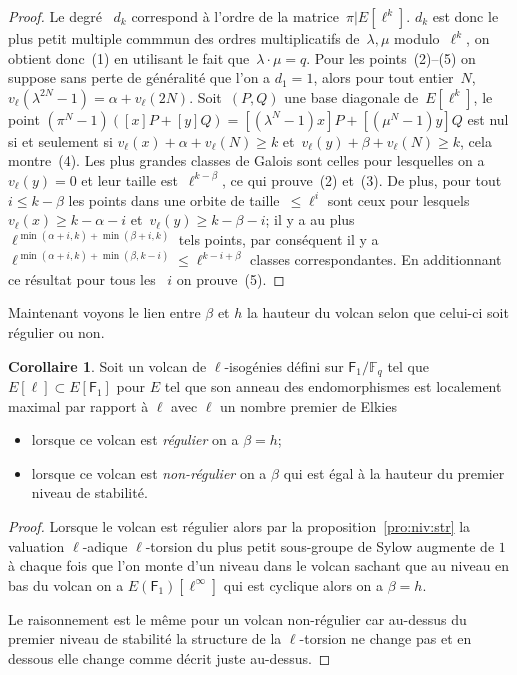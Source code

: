 \documentclass[10pt,a4paper]{book}
\theoremstyle{plain}
\theoremstyle{definition}
\theoremstyle{definition}
\newtheorem{cor}[thm]{Corollaire}
\theoremstyle{definition}
\theoremstyle{definition}
\theoremstyle{remark}
\theoremstyle{remark}
\theoremstyle{definition}
\begin{document}
\begin{proof}
Le degré ~$d_k$ correspond à l'ordre de la matrice~$\pi|E[\ell^k]$.
$d_k$ est donc le plus petit multiple commmun des ordres multiplicatifs
de~$\lambda, \mu$ modulo~$\ell^k$,
on obtient donc~(1) en utilisant le fait que~$\lambda \cdot \mu = q$.
Pour les points~(2)--(5) on suppose sans perte de généralité que l'on a $d_1 = 1$,
alors pour tout entier~$N$, $v_{\ell}(\lambda^{2N}-1) = \alpha + v_{\ell} (2N)$.
Soit~$(P, Q)$ une base diagonale de~$E[\ell^k]$,
le point $(\pi^N - 1) ([x] P + [y] Q) = [(\lambda^N-1) x] P + [(\mu^N-1) y] Q$
est nul si et seulement si $v_{\ell} (x) + \alpha + v_{\ell} (N) \geq k$
et~$v_{\ell} (y) + \beta + v_{\ell} (N) \geq k$, cela montre~(4).
Les plus grandes classes de Galois sont celles pour lesquelles
on a~$v_{\ell} (y) = 0$ et leur taille est~$\ell^{k - \beta}$,
ce qui prouve~(2) et~(3).
De plus, pour tout~$i \leq k-\beta$ les points dans une orbite de taille~$\leqslant \ell^i$
sont ceux pour lesquels~$v_{\ell} (x) \geqslant k - \alpha - i$ et~$v_{\ell} (y) \geqslant k - \beta - i$;
il y a au plus $\ell^{\min(\alpha+i, k) + \min (\beta+i, k)}$ tels points,
par conséquent il y a $\ell^{\min(\alpha+i, k) + \min(\beta, k-i)} \leqslant \ell^{k-i+\beta}$
 classes correspondantes.
En additionnant ce résultat pour tous les ~$i$ on prouve~(5).
\end{proof}

Maintenant voyons le lien entre $\beta$ et $h$ la hauteur du volcan selon que
celui-ci soit régulier ou non.

\begin{cor}
\label{cor:elk:bet:reg}
Soit un volcan de $\ell$-isogénies défini sur $\mathsf{F}_1/\mathbb{F}_q$ tel 
que $E[\ell] \subset E[\mathsf{F}_1]$ pour $E$ tel que son anneau des 
endomorphismes est localement maximal par rapport à $\ell$ avec $\ell$ un 
nombre premier de Elkies  
\begin{itemize}
\item lorsque ce volcan est \emph{régulier} on a $\beta=h$;
\item lorsque ce volcan est \emph{non-régulier} on a $\beta$ qui est égal à la 
hauteur du premier niveau de stabilité.
\end{itemize}
\end{cor}

\begin{proof}
Lorsque le volcan est régulier alors par la proposition~\ref{pro:niv:str} la 
valuation $\ell$-adique $\ell$-torsion du plus petit sous-groupe de Sylow 
augmente de $1$ à chaque fois que l'on monte d'un niveau dans le volcan sachant
que au niveau en bas du volcan on a $E(\mathsf{F}_1)[\ell^{\infty}]$ qui est 
cyclique alors on a $\beta=h$.

Le raisonnement est le même pour un volcan non-régulier car au-dessus du 
premier niveau de stabilité la structure de la $\ell$-torsion ne change pas et 
en dessous elle change comme décrit juste au-dessus.
\end{proof}
\end{document}

